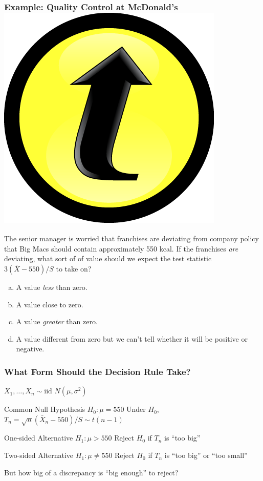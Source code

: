 \documentclass[handout]{beamer}
\begin{document}
\begin{frame}
\frametitle{Example: Quality Control at McDonald's \hfill \includegraphics[scale = 0.05]{./images/clicker}}
The senior manager is worried that franchises are deviating from company policy that Big Macs should contain approximately 550 kcal. \alert{If the franchises \emph{are} deviating, what sort of of value should we expect the test statistic $3(\bar{X} - 550)/S$ to take on?}

\vspace{1em}
\begin{enumerate}[(a)]
	\item A value \emph{less} than zero.
	\item A value close to zero.
	\item A value \emph{greater} than zero.
	\item A value different from zero but we can't tell whether it will be positive or negative.
\end{enumerate}
\end{frame}
\begin{frame}
\frametitle{What Form Should the Decision Rule Take?}
$X_1, \hdots, X_n \sim \mbox{iid } N(\mu, \sigma^2)$ 
\begin{block}{Common Null Hypothesis $H_0\colon \mu = 550$}
Under $H_0$, $T_n = \sqrt{n}(\bar{X}_n - 550)/S \sim t(n-1)$ 
\end{block}
\begin{block}{One-sided Alternative $H_1\colon \mu > 550$}
Reject $H_0$ if $T_n$ is ``too big'' 
\end{block}
\begin{block}{Two-sided Alternative $H_1\colon \mu \neq 550$} 
Reject $H_0$ if $T_n$ is ``too big'' or ``too small''
\end{block}

\vspace{1em}

\alert{But how big of a discrepancy is ``big enough'' to reject?}
\end{frame}
\end{document}
